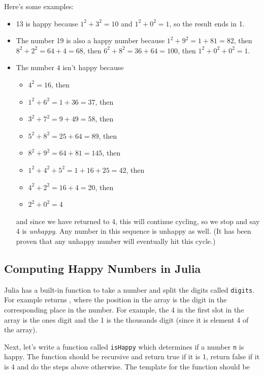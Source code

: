 Here's some examples:

\begin{itemize}

\item 13 is happy because $1^{2}+3^{2}=10$ and $1^{2}+0^{2}=1$, so the result ends in 1.
\item
  The number 19 is also a happy number  because $1^{2}+9^{2}=1+81=82$, then\\ $8^{2}+2^{2}=64+4=68$, then $6^{2}+8^{2}=36+64=100$, then $1^{2}+0^{2}+0^{2}=1$.
\item The number $4$ isn't happy because

\begin{itemize}
\item  $4^{2}=16$, then
\item $1^{2}+6^{2}=1+36=37$, then
\item $3^{2}+7^{2}=9+49=58$, then
\item $5^{2}+8^{2}=25+64=89$, then
\item $8^{2}+9^{2}=64+81=145$, then
\item $1^{2}+4^{2}+5^{2}=1+16+25=42$, then
\item $4^{2}+2^{2}=16+4=20$, then
  \item $2^{2}+0^{2}=4$
  \end{itemize}
%
and since we have returned to 4, this will continue cycling, so we stop and say 4 is \emph{unhappy}. Any number in this sequence is unhappy as well.  (It has been proven that any unhappy number will eventually hit this cycle.)
\end{itemize}

\subsection{Computing Happy Numbers in Julia}

Julia has a built-in function to take a number and split the digits called \verb!digits!.  For example  returns  \printpythontex[verb], where the position in the array is the digit in the corresponding place in the number.  For example, the 4 in the first slot in the array is the ones digit and the 1 is the thousands digit (since it is element 4 of the array). 

Next, let's write a function called \texttt{isHappy} which determines
if a number \texttt{n} is happy. The function should be recursive and
return true if it is 1, return false if it is 4 and do the steps above
otherwise. The template for the function should be

